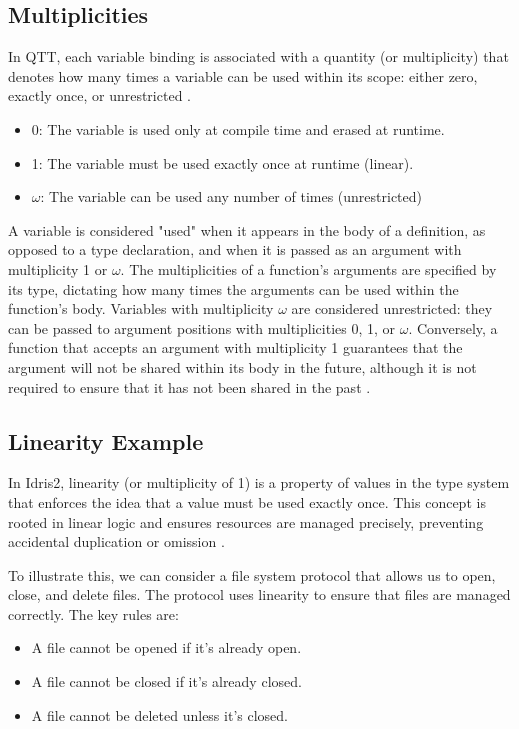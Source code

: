 \documentclass[]{rptuseminar}
\begin{document}
\subsection{Multiplicities}
\label{sec:multiplicities}
In QTT, each variable binding is associated with a quantity (or multiplicity) that denotes how many times a variable can be used within its scope: either zero, exactly once, or unrestricted \cite{atkey2018syntax}.
\begin{itemize}
\item 0: The variable is used only at compile time and erased at runtime.
\item 1: The variable must be used exactly once at runtime (linear). 
\item $\omega$: The variable can be used any number of times (unrestricted)
\end{itemize}

\vspace{1em}
A variable is considered "used" when it appears in the body of a definition, as opposed to a type declaration, and when it is passed as an argument with multiplicity 1 or \(\omega\). The multiplicities of a function's arguments are specified by its type, dictating how many times the arguments can be used within the function's body. Variables with multiplicity \(\omega\) are considered unrestricted: they can be passed to argument positions with multiplicities 0, 1, or \(\omega\). Conversely, a function that accepts an argument with multiplicity 1 guarantees that the argument will not be shared within its body in the future, although it is not required to ensure that it has not been shared in the past \cite{brady2021idris}.

\subsection{Linearity Example}
In Idris2, linearity (or multiplicity of 1) is a property of values in the type system that enforces the idea that a value must be used exactly once. This concept is rooted in linear logic and ensures resources are managed precisely, preventing accidental duplication or omission \cite{brady2021idris}.

To illustrate this, we can consider a file system protocol that allows us to open, close, and delete files. The protocol uses linearity to ensure that files are managed correctly. The key rules are:
\begin{itemize}
    \item A file cannot be opened if it's already open.
    \item A file cannot be closed if it's already closed.
    \item A file cannot be deleted unless it's closed.
\end{itemize}
\end{document}
